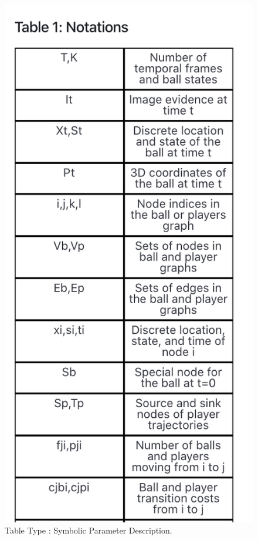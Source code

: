\begin{figure}[h!]
    \centering
    \includegraphics[width=\maxwidth{0.5\textwidth}]{src/images/type-exp-symbolic.png}
    \caption{Table Type : Symbolic Parameter Description. }
    \label{figure\arabic{figurecounter}}
\end{figure}

